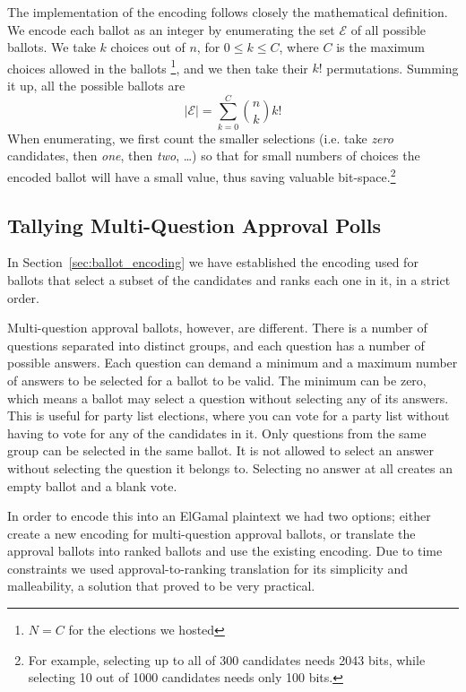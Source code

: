 \documentclass[letterpaper,10pt]{article}
\begin{document}
The implementation of the encoding follows closely the mathematical
definition. We encode each ballot as an integer by enumerating the set
$\mathcal{E}$ of all possible ballots. We take $k$ choices out of $n$,
for $0\leq k \leq C$, where $C$ is the maximum choices allowed in the
ballots \footnote{$N=C$ for the elections we hosted}, and we then take
their $k!$ permutations. Summing it up, all the possible ballots are
\begin{equation}
\label{eq:max_encoded}
|\mathcal{E}| = \sum^{C}_{k=0}\binom{n}{k}k!
\end{equation}
When enumerating, we first count the smaller selections (i.e. take
\textit{zero} candidates, then \textit{one}, then \textit{two},
\ldots) so that for small numbers of choices the encoded ballot will
have a small value, thus saving valuable bit-space.\footnote{ For
  example, selecting up to all of 300 candidates needs 2043 bits,
  while selecting 10 out of 1000 candidates needs only 100 bits.}


\subsection{Tallying Multi-Question Approval Polls}
\label{sec:approval_counting}
In Section~\ref{sec:ballot_encoding} we have established the encoding
used for ballots that select a subset of the candidates and ranks each
one in it, in a strict order.

Multi-question approval ballots, however, are different.
There is a number of questions separated into distinct groups,
and each question has a number of possible answers.
Each question can demand a minimum and a maximum number of answers
to be selected for a ballot to be valid.
The minimum can be zero, which means a ballot may select a question
without selecting any of its answers.
This is useful for party list elections, where you can vote for
a party list without having to vote for any of the candidates in it.
Only questions from the same group can be selected in the same ballot.
It is not allowed to select an answer without selecting the question
it belongs to.
Selecting no answer at all creates an empty ballot and a blank vote.

In order to encode this into an ElGamal plaintext we had two options;
either create a new encoding for multi-question approval ballots,
or translate the approval ballots into ranked ballots and use the
existing encoding.
Due to time constraints we used approval-to-ranking translation for
its simplicity and malleability, a solution that proved to be very
practical.
\end{document}
